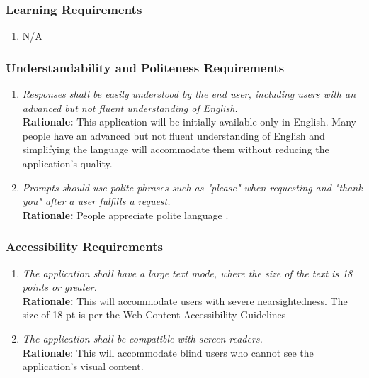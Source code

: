 \documentclass[]{article}
\begin{document}
\subsubsection{Learning Requirements}
\label{ssub:learning_requirements}
\begin{enumerate}[{UH-L}1. ]
	\item N/A
\end{enumerate}

\subsubsection{Understandability and Politeness Requirements}
\label{ssub:understandability_and_politeness_requirements}
\begin{enumerate}[{UH-UP}1. ]
	\item \textit{Responses shall be easily understood by the end user, including users with an advanced but not fluent understanding of English.} \\ \textbf{Rationale:} This application will be initially available only in English. Many people have an advanced but not fluent understanding of English \cite{USCensus} and simplifying the language will accommodate them without reducing the application's quality.
        \item \textit{Prompts should use polite phrases such as "please" when requesting and "thank you" after a user fulfills a request.} \\ \textbf{Rationale:} People appreciate polite language \cite{Standford}.
\end{enumerate}

\subsubsection{Accessibility Requirements}
\label{ssub:accessibility_requirements}
\begin{enumerate}[{UH-A}1. ]
	\item \textit{The application shall have a large text mode, where the size of the text is 18 points or greater.} \\\textbf{Rationale:} This will accommodate users with severe nearsightedness. The size of 18 pt is per the Web Content Accessibility Guidelines \cite{W3}
    \item \textit{The application shall be compatible with screen readers.} \\ \textbf{Rationale}: This will accommodate blind users who cannot see the application's visual content.
\end{enumerate}
\end{document}
